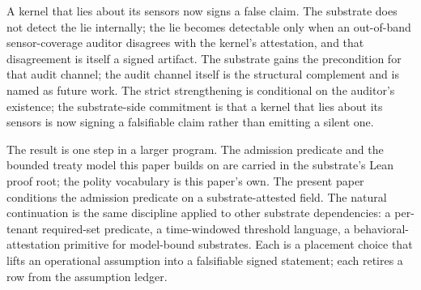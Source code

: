 A kernel that lies about its sensors now signs a false claim. The substrate does not detect the lie internally; the lie becomes detectable only when an out-of-band sensor-coverage auditor disagrees with the kernel's attestation, and that disagreement is itself a signed artifact. The substrate gains the precondition for that audit channel; the audit channel itself is the structural complement and is named as future work. The strict strengthening is conditional on the auditor's existence; the substrate-side commitment is that a kernel that lies about its sensors is now signing a falsifiable claim rather than emitting a silent one.

The result is one step in a larger program. The admission predicate and the bounded treaty model this paper builds on are carried in the substrate's Lean proof root; the polity vocabulary is this paper's own. The present paper conditions the admission predicate on a substrate-attested field. The natural continuation is the same discipline applied to other substrate dependencies: a per-tenant required-set predicate, a time-windowed threshold language, a behavioral-attestation primitive for model-bound substrates. Each is a placement choice that lifts an operational assumption into a falsifiable signed statement; each retires a row from the assumption ledger.
